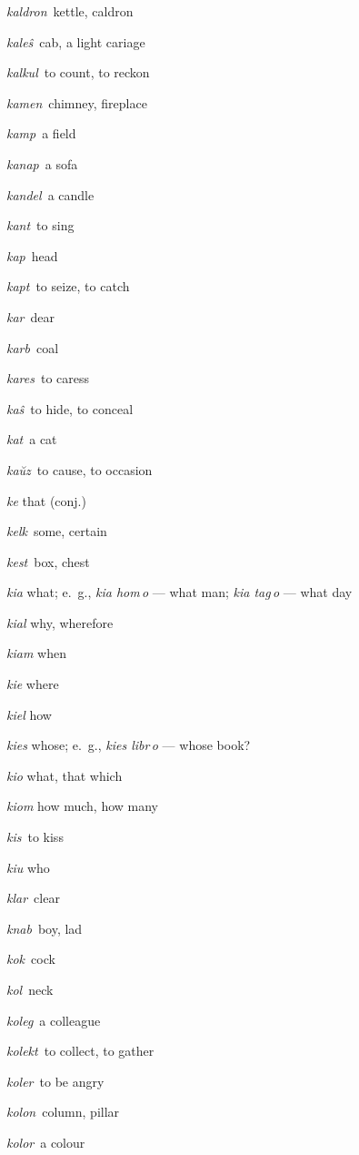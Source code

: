 \begin{landscape}
\begin{multicols}{5}
\begin{outdent}{1em}
\emph{kaldron\,} kettle, caldron

\emph{kaleŝ\,} cab, a light cariage

\emph{kalkul\,} to count, to reckon

\emph{kamen\,} chimney, fireplace

\emph{kamp\,} a field

\emph{kanap\,} a sofa

\emph{kandel\,} a candle

\emph{kant\,} to sing

\emph{kap\,} head

\emph{kapt\,} to seize, to catch

\emph{kar\,} dear

\emph{karb\,} coal

\emph{kares\,} to caress

\emph{kaŝ\,} to hide, to conceal

\emph{kat\,} a cat

\emph{kaŭz\,} to cause, to occasion

\emph{ke} that (conj.)

\emph{kelk\,} some, certain

\emph{kest\,} box, chest

\emph{kia} what; e.~g., \emph{kia hom\,o} — what man; \emph{kia tag\,o} — what day

\emph{kial} why, wherefore

\emph{kiam} when

\emph{kie} where

\emph{kiel} how

\emph{kies} whose; e.~g., \emph{kies libr\,o} — whose book?

\emph{kio} what, that which

\emph{kiom} how much, how many

\emph{kis\,} to kiss

\emph{kiu} who

\emph{klar\,} clear

\emph{knab\,} boy, lad

\emph{kok\,} cock

\emph{kol\,} neck

\emph{koleg\,} a colleague

\emph{kolekt\,} to collect, to gather

\emph{koler\,} to be angry

\emph{kolon\,} column, pillar

\emph{kolor\,} a colour


\end{outdent}
\end{multicols}
\end{landscape}
